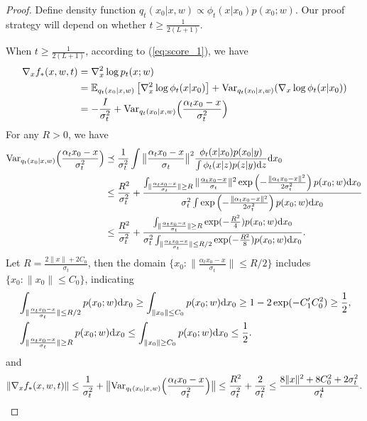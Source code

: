 \documentclass[11pt]{article}
\numberwithin{equation}{section}
\renewcommand{\eqref}[1]{(\ref{#1})}
\begin{document}
\begin{proof}
    Define density function $q_t(x_0|x,w)\propto \phi_t(x|x_0)p(x_0;w)$. 
    Our proof strategy will depend on whether $t\geq\frac{1}{2(L+1)}$.
    
    When $t\geq \frac{1}{2(L+1)}$, according to \eqref{eq:score_1}, we have
    \begin{equation}
        \begin{aligned}
            \nabla_xf_*(x,w,t)
            &=\nabla_x^2\log p_t(x;w) \\
            &=\mathbb{E}_{q_t(x_0|x,w)} \left[\nabla_x^2\log\phi_t(x|x_0)\right] + \mathrm{Var}_{q_t(x_0|x,w)}(\nabla_x\log\phi_t(x|x_0)) \\
            &=-\frac{I}{\sigma_t^2}+ \mathrm{Var}_{q_t(x_0|x,w)}\Big(\frac{\alpha_tx_0-x}{\sigma_t^2}\Big)
        \end{aligned}
    \end{equation}
    For any $R>0$, we have
    \begin{equation}
        \begin{aligned}
            \mathrm{Var}_{q_t(x_0|x,w)}\Big(\frac{\alpha_tx_0-x}{\sigma_t^2}\Big)
            &\preceq \frac{1}{\sigma_t^2}\int \big\|\frac{\alpha_tx_0-x}{\sigma_t}\big\|^2\frac{\phi_t(x|x_0)p(x_0|y)}{\int \phi_t(x|z)p(z|y)\mathrm{d} z}\mathrm{d} x_0 \\
            &\leq \frac{R^2}{\sigma_t^2} + \frac{\int_{\|\frac{\alpha_tx_0-x}{\sigma_t}\|\geq R} \|\frac{\alpha_tx_0-x}{\sigma_t}\|^2\exp\left(-\frac{\|\alpha_tx_0-x\|^2}{2\sigma_t^2}\right)p(x_0;w)\mathrm{d} x_0}{\sigma_t^2\int \exp\left(-\frac{\|\alpha_tx_0-x\|^2}{2\sigma_t^2}\right)p(x_0;w)\mathrm{d} x_0} \\
            &\leq \frac{R^2}{\sigma_t^2} + \frac{\int_{\|\frac{\alpha_tx_0-x}{\sigma_t}\|\geq R} \exp(-\frac{R^2}{4})p(x_0;w)\mathrm{d} x_0}{\sigma_t^2\int_{\|\frac{\alpha_tx_0-x}{\sigma_t}\|\leq R/2} \exp(-\frac{R^2}{8})p(x_0;w)\mathrm{d} x_0}.
        \end{aligned}
    \end{equation}
    Let $R=\frac{2\|x\|+2C_0}{\sigma_t}$, then the domain $\Big\{x_0:\|\frac{\alpha_tx_0-x}{\sigma_t}\|\leq R/2\Big\}$ includes $\Big\{x_0:\|x_0\|\leq C_0\Big\}$, indicating
    \begin{equation}
        \begin{aligned}
            &\int_{\|\frac{\alpha_tx_0-x}{\sigma_t}\|\leq R/2} p(x_0;w)\mathrm{d} x_0\geq  \int_{\|x_0\|\leq C_0} p(x_0;w)\mathrm{d} x_0 \geq 1-2\exp(-C_1'C_0^2)\geq \frac{1}{2},\\
            &\int_{\|\frac{\alpha_tx_0-x}{\sigma_t}\|\geq R} p(x_0;w)\mathrm{d} x_0\leq  \int_{\|x_0\|\geq C_0} p(x_0;w)\mathrm{d} x_0 \leq \frac{1}{2}.
        \end{aligned}
    \end{equation}
    and
    \begin{equation}\label{eq:lip_x_large}
        \|\nabla_xf_*(x,w,t)\|\leq \frac{1}{\sigma_t^2}+\big\|\mathrm{Var}_{q_t(x_0|x,w)}\Big(\frac{\alpha_tx_0-x}{\sigma_t^2}\Big)\big\|
        \leq \frac{R^2}{\sigma_t^2} + \frac{2}{\sigma_t^2} \leq \frac{8\|x\|^2+8C_0^2+2\sigma_t^2}{\sigma_t^4}.
    \end{equation}
    

\end{proof}
\end{document}
